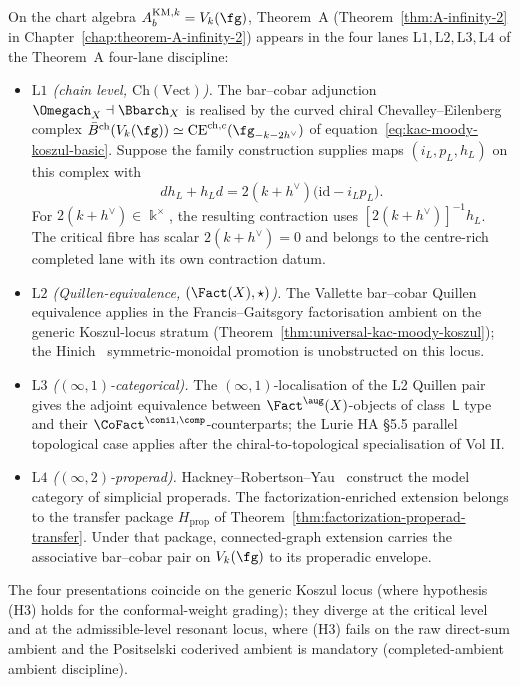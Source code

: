 \begin{remark}
\label{rem:km-theorem-A-four-lanes}
On the chart algebra $A_b^{\mathrm{KM},k}=V_k(\fg)$, Theorem~A
(Theorem~\ref{thm:A-infinity-2} in
Chapter~\ref{chap:theorem-A-infinity-2}) appears in the four lanes
$\mathrm{L}1,\mathrm{L}2,\mathrm{L}3,\mathrm{L}4$
of the Theorem~A four-lane discipline:
\begin{itemize}
\item \emph{$\mathrm{L}1$ (chain level, $\mathrm{Ch}(\mathrm{Vect})$).}
The bar--cobar adjunction
$\Omegach_X\dashv\Bbarch_X$ is realised by the curved chiral
Chevalley--Eilenberg complex
$\bar{B}^{\mathrm{ch}}(V_k(\fg))\simeq
\mathrm{CE}^{\mathrm{ch},c}(\fg_{-k-2h^\vee})$
of equation~\eqref{eq:kac-moody-koszul-basic}.  Suppose the
family construction supplies maps $(i_L,p_L,h_L)$ on this complex
with
\[
d h_L+h_Ld
=2(k+h^\vee)\bigl(\mathrm{id}-i_Lp_L\bigr).
\]
For $2(k+h^\vee)\in\Bbbk^\times$, the resulting contraction uses
$[2(k+h^\vee)]^{-1}h_L$.  The critical fibre has scalar
$2(k+h^\vee)=0$ and belongs to the centre-rich completed lane with
its own contraction datum.
\item \emph{$\mathrm{L}2$ (Quillen-equivalence,
$(\Fact(X),\star)$).}
The Vallette bar--cobar Quillen equivalence
\cite[Theorem~2.1]{Val16} applies in the Francis--Gaitsgory
factorisation ambient on the generic Koszul-locus stratum
(Theorem~\ref{thm:universal-kac-moody-koszul}); the
Hinich~\cite{Hinich2003} symmetric-monoidal promotion is
unobstructed on this locus.
\item \emph{$\mathrm{L}3$ ($(\infty,1)$-categorical).}
The $(\infty,1)$-localisation of the L2 Quillen pair gives the
adjoint equivalence between
$\Fact^{\aug}(X)$-objects of class~$\mathsf{L}$ type and
their $\CoFact^{\conil,\comp}$-counterparts; the Lurie HA \S5.5
parallel topological case applies after the chiral-to-topological
specialisation of Vol II.
\item \emph{$\mathrm{L}4$ ($(\infty,2)$-properad).}
Hackney--Robertson--Yau~\cite[Theorem~5.3]{HRY17} construct the
model category of simplicial properads.  The factorization-enriched
extension belongs to the transfer package $H_{\mathrm{prop}}$ of
Theorem~\ref{thm:factorization-properad-transfer}.  Under that package,
connected-graph extension carries the associative bar--cobar pair on
$V_k(\fg)$ to its properadic envelope.
\end{itemize}
The four presentations coincide on the generic Koszul locus (where
hypothesis (H3) holds for the conformal-weight grading);
they diverge at the critical level and at the admissible-level
resonant locus, where (H3) fails on the raw direct-sum ambient and
the Positselski coderived ambient is mandatory
(completed-ambient ambient discipline).
\end{remark}


